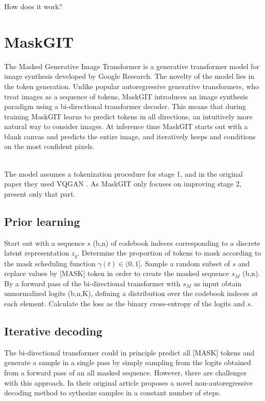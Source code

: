 \documentclass[../../thesis.tex]{subfiles}
\begin{document}
How does it work?


\section{MaskGIT}

The Masked Generative Image Transformer is a generative transformer model for image synthesis developed by Google Research. The novelty of the model lies in the token generation. Unlike popular autoregressive generative transformers, who treat images as a sequence of tokens, MaskGIT introduces an image synthesis paradigm using a bi-directional transformer decoder. This means that during training MaskGIT learns to predict tokens in all directions, an intuitively more natural way to consider images. At inference time MaskGIT starts out with a blank canvas and predicts the entire image, and iteratively keeps and conditions on the most confident pixels.\\\\


The model assumes a tokenization procedure for stage 1, and in the original paper they used VQGAN \cite{VQGAN}. As MaskGIT only focuses on improving stage 2, present only that part. 

\subsection{Prior learning}

Start out with a sequence $s$ (b,n) of codebook indeces corresponding to a discrete latent representation $z_q$. Determine the proportion of tokens to mask according to the mask scheduling function $\gamma(t)\in (0,1]$. 
Sample a random subset of $s$ and replace values by [MASK] token in order to create the masked sequence $s_M$ (b,n). By a forward pass of the bi-directional transformer with $s_M$ as input obtain unnormalized logits (b,n,K), defining a distribution over the codebook indeces at each element. Calculate the loss as the binary cross-entropy of the logits and $s$. 

\subsection{Iterative decoding}

The bi-directional transformer could in principle predict all [MASK] tokens and generate a sample in a single pass by simply sampling from the logits obtained from a forward pass of an all masked sequence. However, there are challenges with this approach. In their original article  \cite{chang2022maskgit} proposes a novel non-autoregressive decoding method to sythesize samples in a constant number of steps.\\\\
\end{document}
